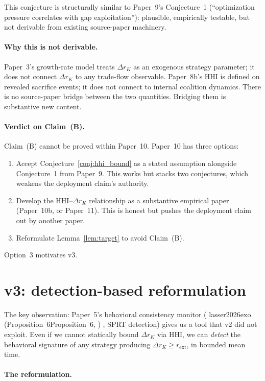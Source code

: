 \documentclass{article}
\makeatletter
\newcommand{\citep}[2][]{%
  \begingroup
  \def\@tmpkey{#2}%
  \ifx\@tmpkey\@empty\else
    (\ifx\@empty#1\@empty\else #1, \fi
     \@nameuse{bibkey@\@tmpkey})%
  \fi
  \endgroup
}
\newcommand{\rext}{r_{\mathrm{ext}}}
\makeatother
\begin{document}
This conjecture is structurally similar to Paper~9's Conjecture~1
(``optimization pressure correlates with gap exploitation''):
plausible, empirically testable, but not derivable from existing
source-paper machinery.

\paragraph{Why this is not derivable.}
Paper~3's growth-rate model treats $\Delta r_K$ as an exogenous
strategy parameter; it does not connect $\Delta r_K$ to any
trade-flow observable.  Paper~8b's HHI is defined on revealed
sacrifice events; it does not connect to internal coalition dynamics.
There is no source-paper bridge between the two quantities.  Bridging
them is substantive new content.

\paragraph{Verdict on Claim~(B).}
Claim~(B) cannot be proved within Paper~10.  Paper~10 has three
options:
\begin{enumerate}
\item Accept Conjecture~\ref{conj:hhi_bound} as a stated assumption
  alongside Conjecture~1 from Paper~9.  This works but stacks two
  conjectures, which weakens the deployment claim's authority.
\item Develop the HHI--$\Delta r_K$ relationship as a substantive
  empirical paper (Paper~10b, or Paper~11).  This is honest but pushes
  the deployment claim out by another paper.
\item Reformulate Lemma~\ref{lem:target} to avoid Claim~(B).
\end{enumerate}

Option~3 motivates v3.

\section{v3: detection-based reformulation}

The key observation: Paper~5's behavioral consistency monitor
(\citep[Proposition~6]{lasser2026exo}, SPRT detection) gives us a tool
that v2 did not exploit.  Even if we cannot statically bound
$\Delta r_K$ via HHI, we can \emph{detect} the behavioral signature of
any strategy producing $\Delta r_K \geq \rext$, in bounded mean time.

\paragraph{The reformulation.}
\end{document}
